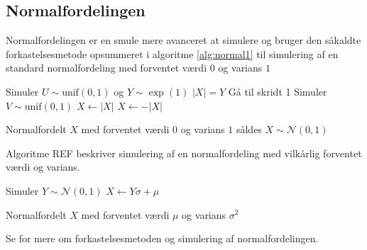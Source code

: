 \subsection{Normalfordelingen}
Normalfordelingen er en smule mere avanceret at simulere og bruger den såkaldte forkastelsesmetode opsummeret i algoritme \ref{alg:normal1} til simulering af en standard normalfordeling med forventet værdi $0$ og varians $1$
\begin{algorithm}[H]
\begin{algorithmic}[1]
\STATE Simuler $U \sim \text{unif}(0,1)$ og $Y \sim \exp(1)$  
\STATE $|X| = Y$ 
\ELSE
\STATE Gå til skridt 1
\ENDIF
\STATE Simuler $V \sim \text{unif}(0,1)$ 
\STATE $X \gets |X|$
\ELSE
\STATE $X \gets -|X|$
\ENDIF
\end{algorithmic}
\caption{Normalfordelt $X$ med forventet værdi $0$ og varians $1$ såldes $X \sim \mathcal{N}(0,1)$} \label{alg:normal1}
\end{algorithm}
Algoritme REF beskriver simulering af en normalfordeling med vilkårlig forventet værdi og varians.
\begin{algorithm}[H]
\begin{algorithmic}
\STATE Simuler $Y \sim \mathcal{N}(0,1)$ 
\STATE $X \gets Y\sigma + \mu$
\end{algorithmic}
\caption{Normalfordelt $X$ med forventet værdi $\mu$ og varians $\sigma^2$} \label{alg:normal2}
\end{algorithm}
Se \cite[288-290]{olofsson2012} for mere om forkastelsesmetoden og simulering af normalfordelingen. 
